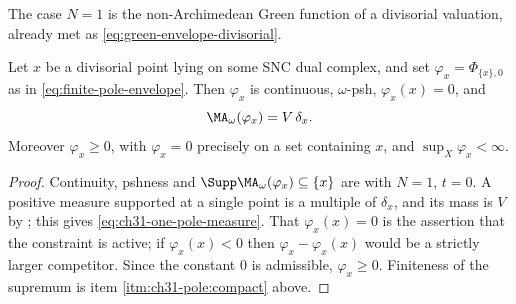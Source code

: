 The case \(N=1\) is the non-Archimedean Green function of a divisorial
valuation, already met as \eqref{eq:green-envelope-divisorial}.

\begin{proposition}
\label{prop:ch31-one-pole}
Let \(x\) be a divisorial point lying on some SNC dual complex, and set
\(\varphi_x=\Phi_{\{x\},0}\) as in \eqref{eq:finite-pole-envelope}.  Then
\(\varphi_x\) is continuous, \(\omega\)-psh, \(\varphi_x(x)=0\), and
\begin{equation}
\label{eq:ch31-one-pole-measure}
 \MA_\omega(\varphi_x)=V\,\delta_x .
\end{equation}
Moreover \(\varphi_x\geq0\), with \(\varphi_x=0\) precisely on a set
containing \(x\), and \(\sup_X\varphi_x<\infty\).
\end{proposition}

\begin{proof}
Continuity, pshness and \(\Supp\MA_\omega(\varphi_x)\subseteq\{x\}\) are
 with \(N=1\), \(t=0\).  A positive measure
supported at a single point is a multiple of \(\delta_x\), and its mass is
\(V\) by ; this gives
\eqref{eq:ch31-one-pole-measure}.  That \(\varphi_x(x)=0\) is the assertion
that the constraint is active; if \(\varphi_x(x)<0\) then
\(\varphi_x-\varphi_x(x)\) would be a strictly larger competitor.  Since
the constant \(0\) is admissible, \(\varphi_x\geq0\).  Finiteness of the
supremum is item \cref{itm:ch31-pole:compact} above.
\end{proof}

